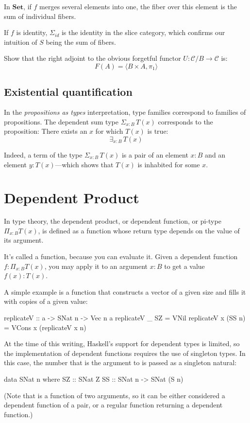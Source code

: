 \documentclass[DaoFP]{subfiles}
\begin{document}
In $\mathbf{Set}$, if $f$ merges several elements into one, the fiber over this element is the sum of individual fibers. 

If $f$ is identity, $\Sigma_{\mathit{id}}$ is the identity in the slice category, which confirms our intuition of $S$ being the sum of fibers.

\begin{exercise}
Show that the right adjoint to the obvious forgetful functor $U \colon \mathcal{C}/B \to \mathcal{C}$ is:
\[ F (A) = \langle B \times A, \pi_1 \rangle \]
\end{exercise}

\subsection{Existential quantification}

In the \emph{propositions as types} interpretation, type families correspond to families of propositions. The dependent sum type $\Sigma_{x : B} \, T(x)$ corresponds to the proposition: There exists an $x$ for which $T(x)$ is true:
\[ \exists_{x : B} \, T (x)\]

Indeed, a term of the type $\Sigma_{x : B} \, T(x)$ is a pair of an element $x \colon B$ and an element $y \colon T(x)$---which shows that $T(x)$ is inhabited for some $x$.

\section{Dependent Product}

In type theory, the dependent product, or dependent function, or pi-type $\Pi_{x:B} T(x)$, is defined as a function whose return type depends on the value of its argument. 

It's called a function, because you can evaluate it. Given a dependent function  $f \colon \Pi_{x:B} T(x)$, you may apply it to an argument $x\colon B$ to get a value $f(x) \colon T(x)$.

A simple example is a function that constructs a vector of a given size and fills it with copies of a given value:
\begin{haskell}
replicateV :: a -> SNat n -> Vec n a
replicateV _ SZ  = VNil
replicateV x (SS n) = VCons x (replicateV x n)
\end{haskell}

At the time of this writing, Haskell's support for dependent types is limited, so the implementation of dependent functions requires the use of singleton types. In this case, the number that is the argument to  is passed as a singleton natural:
\begin{haskell}
data SNat n where
  SZ :: SNat Z
  SS :: SNat n -> SNat (S n)
\end{haskell}
(Note that  is a function of two arguments, so it can be either considered a dependent function of a pair, or a regular function returning a dependent function.)
\end{document}
